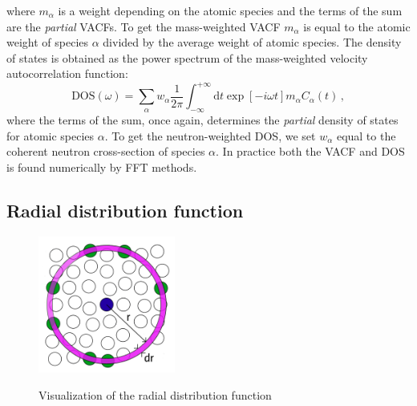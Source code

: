 \noindent where $m_\alpha$ is a weight depending on the atomic species and the terms of the sum are the \emph{partial} VACFs. To get the mass-weighted VACF $m_\alpha$ is equal to the atomic weight of species $\alpha$ divided by the average weight of atomic species. The density of states is obtained as the power spectrum of the mass-weighted velocity autocorrelation function:
%
\[ \text{DOS}(\omega) = \sum_\alpha w_\alpha \frac{1}{2\pi} \int^{+\infty}_{-\infty} \mathrm{d}t \exp[-i\omega t] m_\alpha C_\alpha(t) \, , \]
%
where the terms of the sum, once again, determines the \emph{partial} density of states for atomic species $\alpha$. To get the neutron-weighted DOS, we set $w_\alpha$ equal to the coherent neutron cross-section of species $\alpha$. In practice both the VACF and DOS is found numerically by FFT methods.

\subsection{Radial distribution function}

\begin{figure}
	\centering
	\includegraphics[width=0.4\textwidth]{fig/temp/gr.png}
	\label{fig:rdf}
	\caption[RDF visualization]{Visualization of the radial distribution function}
\end{figure}

